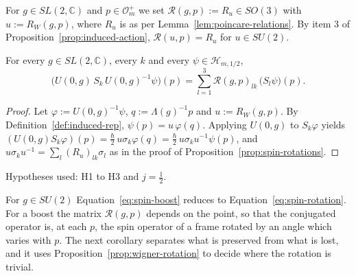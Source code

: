 For $g\in SL(2,\mathbb{C})$ and $p\in\mathcal{O}_m^+$ we set $\mathcal{R}(g,p):=R_u\in SO(3)$ with $u:=R_W(g,p)$, where $R_u$ is as per Lemma~\ref{lem:poincare-relations}. By item 3 of Proposition~\ref{prop:induced-action}, $\mathcal{R}(u,p)=R_u$ for $u\in SU(2)$.

\begin{proposition}\label{prop:spin-boost}
	For every $g\in SL(2,\mathbb{C})$, every $k$ and every $\psi\in\mathcal{H}_{m,1/2}$,
	\begin{equation}\label{eq:spin-boost}
		\big(U(0,g)\,S_k\,U(0,g)^{-1}\psi\big)(p)=\sum_{l=1}^3\mathcal{R}(g,p)_{lk}\,\big(S_l\psi\big)(p).
	\end{equation}
\end{proposition}

\begin{proof}
	Let $\varphi:=U(0,g)^{-1}\psi$, $q:=\Lambda(g)^{-1}p$ and $u:=R_W(g,p)$. By Definition~\ref{def:induced-rep}, $\psi(p)=u\,\varphi(q)$. Applying $U(0,g)$ to $S_k\varphi$ yields $(U(0,g)S_k\varphi)(p)=\frac\hbar2\,u\sigma_k\varphi(q)=\frac\hbar2\,u\sigma_ku^{-1}\psi(p)$, and $u\sigma_ku^{-1}=\sum_l(R_u)_{lk}\sigma_l$ as in the proof of Proposition~\ref{prop:spin-rotations}.
\end{proof}

\noindent Hypotheses used: H1 to H3 and $j=\frac12$.

For $g\in SU(2)$ Equation~\eqref{eq:spin-boost} reduces to Equation~\eqref{eq:spin-rotation}. For a boost the matrix $\mathcal{R}(g,p)$ depends on the point, so that the conjugated operator is, at each $p$, the spin operator of a frame rotated by an angle which varies with $p$. The next corollary separates what is preserved from what is lost, and it uses Proposition~\ref{prop:wigner-rotation} to decide where the rotation is trivial.

